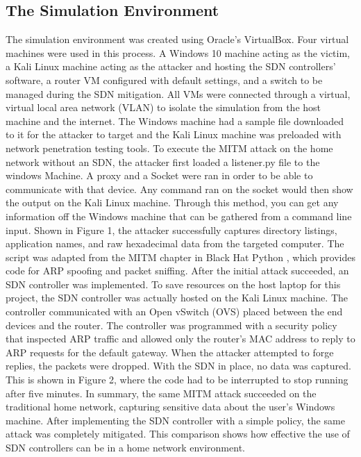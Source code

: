 \documentclass[12pt]{article}
\begin{document}
\subsection{The Simulation Environment}
The simulation environment was created using Oracle's VirtualBox. Four virtual machines were used in 
this process. A Windows 10 machine acting as the victim, a Kali Linux machine acting as the attacker 
and hosting the SDN controllers' software, a router VM configured with default settings, and a switch 
to be managed during the SDN mitigation. All VMs were connected through a virtual, virtual local area 
network (VLAN) to isolate the simulation from the host machine and the internet. The Windows machine 
had a sample file downloaded to it for the attacker to target and the Kali Linux machine was preloaded 
with network penetration testing tools. 
To execute the MITM attack on the home network without an SDN, the attacker first loaded a listener.py 
file to the windows Machine. A proxy and a Socket were ran in order to be able to communicate with that 
device. Any command ran on the socket would then show the output on the Kali Linux machine. Through 
this method, you can get any information off the Windows machine that can be gathered from a command 
line input. Shown in Figure 1, the attacker successfully captures directory listings, application names, 
and raw hexadecimal data from the targeted computer. The script was adapted from the MITM chapter in 
Black Hat Python \cite{seitz2021blackhat}, which provides code for ARP spoofing and packet sniffing. 
After the initial attack succeeded, an SDN controller was implemented. To save resources on the host 
laptop for this project, the SDN controller was actually hosted on the Kali Linux machine. The controller 
communicated with an Open vSwitch (OVS) placed between the end devices and the router. The controller was 
programmed with a security policy that inspected ARP traffic and allowed only the router's MAC address to 
reply to ARP requests for the default gateway. When the attacker attempted to forge replies, the packets 
were dropped. With the SDN in place, no data was captured. This is shown in Figure 2, where the code had 
to be interrupted to stop running after five minutes. 
In summary, the same MITM attack succeeded on the traditional home network, capturing sensitive data about 
the user's Windows machine. After implementing the SDN controller with a simple policy, the same attack was 
completely mitigated. This comparison shows how effective the use of SDN controllers can be in a home 
network environment.
\end{document}

